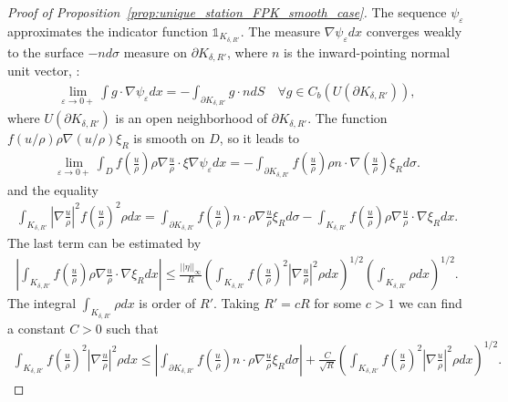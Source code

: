 \documentclass[11pt]{article}
\numberwithin{equation}{section}
\theoremstyle{definition}
\begin{document}
\begin{proof}[Proof of Proposition~\ref{prop:unique_station_FPK_smooth_case}]
The sequence $\psi_{\varepsilon}$ approximates the indicator function $\mathds{1}_{K_{\delta, R'}}$. The measure $\nabla \psi_{\varepsilon}dx$ converges weakly to the surface $-n d\sigma$ measure on $\partial K_{\delta, R'}$, where $n$ is the inward-pointing normal unit vector,  \cite[Chapter 5]{evans2025measure}:
\begin{align*}
    \lim\limits_{\varepsilon\to 0+}\int g\cdot  \nabla\psi_{\varepsilon}dx
    = -\int_{\partial K_{\delta, R'}} g\cdot n dS\quad\forall g\in C_{b}(U(\partial K_{\delta, R'})),
\end{align*}
where $U(\partial K_{\delta, R'})$ is an open neighborhood of $\partial K_{\delta, R'}$. The function $f\left(u/\rho\right)\rho\nabla\left(u/\rho\right)\xi_{R}$ is smooth on $D$, so it leads to 
\begin{align*}
    \lim\limits_{\varepsilon\to 0+}\int_{D}f\left(\frac{u}{\rho}\right) \rho\nabla\frac{u}{\rho}\cdot\xi\nabla\psi_{\varepsilon}dx 
    = -\int_{\partial K_{\delta, R'}}f\left(\frac{u}{\rho}\right)  \rho n\cdot\nabla\left(\frac{u}{\rho}\right) \xi_{R} d\sigma.
\end{align*}
and the equality 
\begin{align*}
    \int_{ K_{\delta, R'}}\left|\nabla\frac{u}{\rho}\right|^{2}f\left(\frac{u}{\rho}\right)^2\rho dx
    = \int_{\partial K_{\delta, R'}}f\left(\frac{u}{\rho}\right)n\cdot\rho\nabla\frac{u}{\rho} \xi_{R} d\sigma 
    -\int_{ K_{\delta, R'}}  f\left(\frac{u}{\rho}\right) \rho\nabla\frac{u}{\rho}\cdot \nabla\xi_{R} dx.
\end{align*}
The last term can be estimated by
\begin{align*}
    \left|\int_{ K_{\delta, R'}}  f\left(\frac{u}{\rho}\right) \rho\nabla\frac{u}{\rho}\cdot \nabla\xi_{R} dx\right| 
    \le \frac{||\eta||_{\infty}}{R}\left(\int_{K_{\delta, R'}} f\left(\frac{u}{\rho}\right)^{2}\left|\nabla\frac{u}{\rho}\right|^{2}\rho dx\right)^{1/2}\left(\int_{K_{\delta, R'}} \rho dx\right)^{1/2}.
\end{align*}
The integral $\int_{K_{\delta, R'}} \rho dx$ is order of $R'$. Taking $R' = cR$ for some $c>1$ we can find a constant $C>0$ such that 
\begin{align*}
    \int_{K_{\delta, R'}} f\left(\frac{u}{\rho}\right)^{2}\left|\nabla\frac{u}{\rho}\right|^{2}\rho dx
    \le \left|\int_{\partial K_{\delta, R'}}f\left(\frac{u}{\rho}\right)n\cdot\rho\nabla\frac{u}{\rho} \xi_{R} d\sigma \right| 
    + \frac{C}{\sqrt{R}}\left(\int_{K_{\delta, R'}} f\left(\frac{u}{\rho}\right)^{2}\left|\nabla\frac{u}{\rho}\right|^{2}\rho dx\right)^{1/2}.

\end{align*}
\end{proof}
\end{document}
